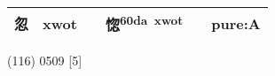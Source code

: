 \documentclass[14pt,a4paper]{scrartcl}
\begin{document}
\begin{longtable}[c]{@{}llllll@{}}
\begin{minipage}[t]{0.14\columnwidth}\raggedright\strut
忽
\strut\end{minipage} &
\begin{minipage}[t]{0.14\columnwidth}\raggedright\strut
xwot
\strut\end{minipage} &
\begin{minipage}[t]{0.14\columnwidth}\raggedright\strut
\strut\end{minipage} &
\begin{minipage}[t]{0.14\columnwidth}\raggedright\strut
惚\textsuperscript{60da~xwot}
\strut\end{minipage} &
\begin{minipage}[t]{0.14\columnwidth}\raggedright\strut
\strut\end{minipage} &
\begin{minipage}[t]{0.14\columnwidth}\raggedright\strut
pure:A
\strut\end{minipage}\tabularnewline
\bottomrule
\end{longtable}

(116) 0509 {[}5{]}
\end{document}
